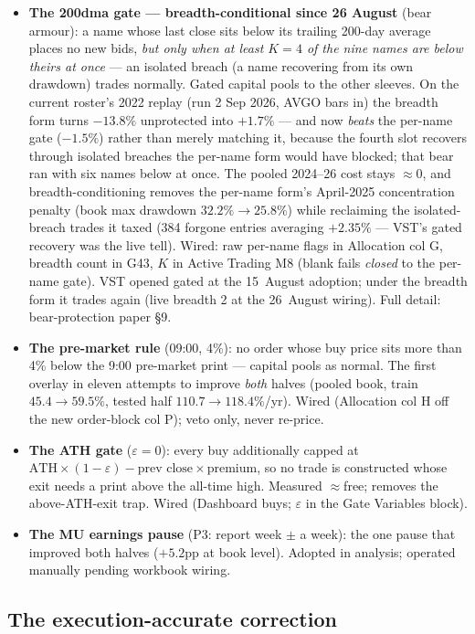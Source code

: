\documentclass[11pt,a4paper]{article}
\begin{document}
\begin{itemize}
\item \textbf{The 200dma gate --- breadth-conditional since 26 August} (bear
armour): a name whose last close sits below its trailing 200-day average places
no new bids, \emph{but only when at least $K{=}4$ of the nine names are below
theirs at once} --- an isolated breach (a name recovering from its own drawdown)
trades normally. Gated capital pools to the other sleeves. On the current
roster's 2022 replay (run 2 Sep 2026, AVGO bars in) the breadth form turns
$-13.8\%$ unprotected into $+1.7\%$ --- and now \emph{beats} the per-name gate
($-1.5\%$) rather than merely matching it, because the fourth slot recovers
through isolated breaches the per-name form would have blocked; that bear ran
with six names below at once. The pooled 2024--26 cost stays $\approx$0, and
breadth-conditioning removes the per-name form's April-2025 concentration
penalty (book max drawdown $32.2\% \to 25.8\%$) while reclaiming the
isolated-breach trades it taxed (384 forgone entries averaging $+2.35\%$ ---
VST's gated recovery was the live tell). Wired: raw per-name flags in
Allocation col G, breadth count in G43, $K$ in Active Trading M8 (blank fails
\emph{closed} to the per-name gate). VST opened gated at the 15~August
adoption; under the breadth form it trades again (live breadth 2 at the
26~August wiring). Full detail: bear-protection paper \S9.
\item \textbf{The pre-market rule} (09:00, 4\%): no order whose buy price sits
more than 4\% below the 9:00 pre-market print --- capital pools as normal. The
first overlay in eleven attempts to improve \emph{both} halves (pooled book,
train $45.4 \to 59.5\%$, tested half $110.7 \to 118.4\%$/yr). Wired
(Allocation col H off the new order-block col P); veto only, never re-price.
\item \textbf{The ATH gate} ($\varepsilon = 0$): every buy additionally capped
at $\text{ATH} \times (1-\varepsilon) - \text{prev close} \times \text{premium}$,
so no trade is constructed whose exit needs a print above the all-time high.
Measured $\approx$free; removes the above-ATH-exit trap. Wired (Dashboard buys;
$\varepsilon$ in the Gate Variables block).
\item \textbf{The MU earnings pause} (P3: report week $\pm$ a week): the one
pause that improved both halves ($+5.2$pp at book level). Adopted in analysis;
operated manually pending workbook wiring.
\end{itemize}

\subsection{The execution-accurate correction}
\end{document}
